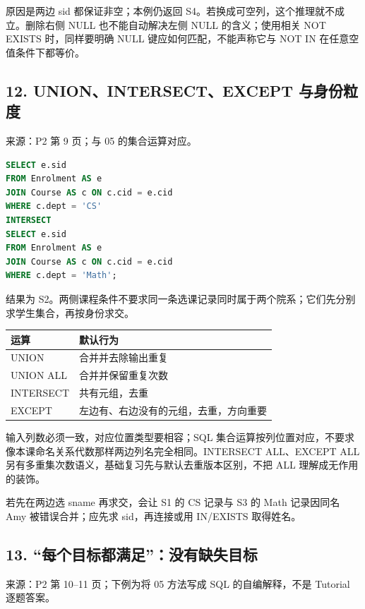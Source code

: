 原因是两边 sid 都保证非空；本例仍返回 S4。若换成可空列，这个推理就不成立。删除右侧 NULL 也不能自动解决左侧 NULL 的含义；使用相关 NOT EXISTS 时，同样要明确 NULL 键应如何匹配，不能声称它与 NOT IN 在任意空值条件下都等价。

\subsection{12. UNION、INTERSECT、EXCEPT 与身份粒度}\label{06_sql_queries_zh-unionintersectexcept-ux4e0eux8eabux4efdux7c92ux5ea6}

来源：P2 第 9 页；与 05 的集合运算对应。

\Needspace{165pt}
\begin{lstlisting}[language=SQL]
SELECT e.sid
FROM Enrolment AS e
JOIN Course AS c ON c.cid = e.cid
WHERE c.dept = 'CS'
INTERSECT
SELECT e.sid
FROM Enrolment AS e
JOIN Course AS c ON c.cid = e.cid
WHERE c.dept = 'Math';
\end{lstlisting}

结果为 S2。两侧课程条件不要求同一条选课记录同时属于两个院系；它们先分别求学生集合，再按身份求交。

\begin{longtable}[]{@{}ll@{}}
\toprule\noalign{}
运算 & 默认行为 \\
\midrule\noalign{}
\endhead
\bottomrule\noalign{}
\endlastfoot
UNION & 合并并去除输出重复 \\
UNION ALL & 合并并保留重复次数 \\
INTERSECT & 共有元组，去重 \\
EXCEPT & 左边有、右边没有的元组，去重，方向重要 \\
\end{longtable}

输入列数必须一致，对应位置类型要相容；SQL 集合运算按列位置对应，不要求像本课命名关系代数那样两边列名完全相同。INTERSECT ALL、EXCEPT ALL 另有多重集次数语义，基础复习先与默认去重版本区别，不把 ALL 理解成无作用的装饰。

若先在两边选 sname 再求交，会让 S1 的 CS 记录与 S3 的 Math 记录因同名 Amy 被错误合并；应先求 sid，再连接或用 IN/EXISTS 取得姓名。

\subsection{13. ``每个目标都满足''：没有缺失目标}\label{06_sql_queries_zh-ux6bcfux4e2aux76eeux6807ux90fdux6ee1ux8db3ux6ca1ux6709ux7f3aux5931ux76eeux6807}

来源：P2 第 10--11 页；下例为将 05 方法写成 SQL 的自编解释，不是 Tutorial 逐题答案。

